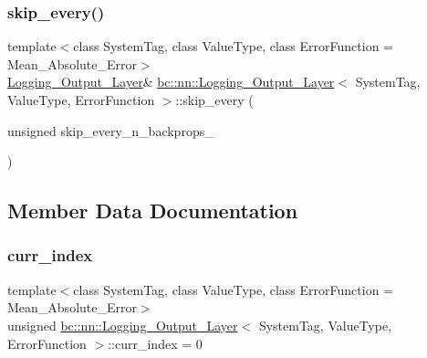 \mbox{\label{structbc_1_1nn_1_1Logging__Output__Layer_ae71754132dbdde7afd6658651140d0ba}} 
\subsubsection{\texorpdfstring{skip\+\_\+every()}{skip\_every()}}
{\footnotesize\ttfamily template$<$class System\+Tag, class Value\+Type, class Error\+Function = Mean\+\_\+\+Absolute\+\_\+\+Error$>$ \\
\hyperlink{structbc_1_1nn_1_1Logging__Output__Layer}{Logging\+\_\+\+Output\+\_\+\+Layer}\& \hyperlink{structbc_1_1nn_1_1Logging__Output__Layer}{bc\+::nn\+::\+Logging\+\_\+\+Output\+\_\+\+Layer}$<$ System\+Tag, Value\+Type, Error\+Function $>$\+::skip\+\_\+every (\begin{DoxyParamCaption}\item[{unsigned}]{skip\+\_\+every\+\_\+n\+\_\+backprops\+\_\+ }\end{DoxyParamCaption})\hspace{0.3cm}{\ttfamily [inline]}}



\subsection{Member Data Documentation}
\mbox{\label{structbc_1_1nn_1_1Logging__Output__Layer_a46ff3180b1082cf438a0d0b8316942cd}} 
\subsubsection{\texorpdfstring{curr\+\_\+index}{curr\_index}}
{\footnotesize\ttfamily template$<$class System\+Tag, class Value\+Type, class Error\+Function = Mean\+\_\+\+Absolute\+\_\+\+Error$>$ \\
unsigned \hyperlink{structbc_1_1nn_1_1Logging__Output__Layer}{bc\+::nn\+::\+Logging\+\_\+\+Output\+\_\+\+Layer}$<$ System\+Tag, Value\+Type, Error\+Function $>$\+::curr\+\_\+index = 0}

